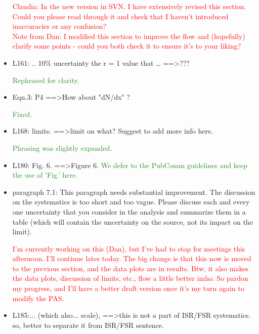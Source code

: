 \documentclass[paper=a4, fontsize=11pt]{scrartcl}
\begin{document}
\begin{itemize}
\textcolor{Red}{Claudia: In the new version in SVN, I have extensively revised this section.
Could you please read through it and check that I haven't introduced
inaccuracies or any confusion?\\
Note from Dan: I modified this section to improve the flow and (hopefully)
clarify some points - could you both check it to ensure it's to your liking?}\\

\item L161: 
.. 10\% uncertainty the r = 1 value that … ==\textgreater ??? 

\textcolor{ForestGreen}{Rephrased for clarity.}\\

\item Eqn.3: 
P4 ==\textgreater How about "dN/dx" ? 

\textcolor{ForestGreen}{Fixed.}\\

\item L168: 
limits. ==\textgreater limit on what? Suggest to add more info here. 

\textcolor{ForestGreen}{Phrasing was slightly expanded.}\\

\item L180:
Fig. 6. ==\textgreater Figure 6.
\textcolor{ForestGreen}{We defer to the PubComm guidelines and keep the use of 'Fig.' here.}\\


\item paragraph 7.1: 
This paragraph needs substantial improvement. The discussion on the 
systematics is too short and too vague. Please discuss each and every one 
uncertainty that you consider in the analysis and summarize them in a table 
(which will contain the uncertainty on the source, not its impact on the 
limit). 

\textcolor{Red}{I'm currently working on this (Dan), but I've had to stop
for meetings this afternoon. I'll continue later today. The big change is
that this now is moved to the previous section, and the data plots are in
results. Btw, it also makes the data plots, discussion of limits, etc.,
flow a little better imho. So pardon my progress, and I'll have a better
draft version once it's my turn again to modify the PAS.}\\


\item L185:... (which also... scale), ==\textgreater this is not a part of ISR/FSR 
systematics. so, better to separate it from ISR/FSR sentence.


\end{itemize}
\end{document}

